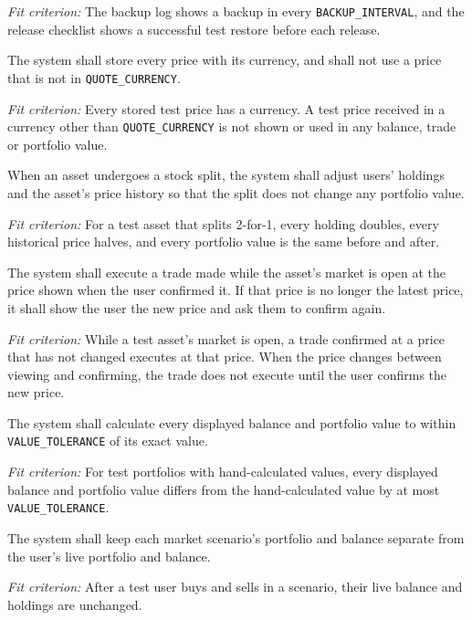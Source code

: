 \documentclass[12pt]{article}
\begin{document}
\begin{description}
\textit{Fit criterion:} The backup log shows a backup in every
\texttt{BACKUP\_INTERVAL}, and the release checklist shows a successful test
restore before each release.

\item[SEC-27 (Prices in one currency).] The system shall store every price with its currency, and shall not use a
price that is not in \texttt{QUOTE\_CURRENCY}.

\textit{Fit criterion:} Every stored test price has a currency. A test price
received in a currency other than \texttt{QUOTE\_CURRENCY} is not shown or
used in any balance, trade or portfolio value.

\item[SEC-28 (Apply stock splits).] When an asset undergoes a stock split, the system shall adjust users' holdings
and the asset's price history so that the split does not change any portfolio
value.

\textit{Fit criterion:} For a test asset that splits 2-for-1, every holding
doubles, every historical price halves, and every portfolio value is the same
before and after.

\item[SEC-29 (Trade at the confirmed price).] The system shall execute a trade made while the asset's market is open at the
price shown when the user confirmed it. If that price is no longer the latest
price, it shall show the user the new price and ask them to confirm again.

\textit{Fit criterion:} While a test asset's market is open, a trade confirmed
at a price that has not changed executes at that price. When the price changes
between viewing and confirming, the trade does not execute until the user
confirms the new price.

\item[SEC-30 (Accurate values).] The system shall calculate every displayed balance and portfolio value to
within \texttt{VALUE\_TOLERANCE} of its exact value.

\textit{Fit criterion:} For test portfolios with hand-calculated values, every
displayed balance and portfolio value differs from the hand-calculated value
by at most \texttt{VALUE\_TOLERANCE}.

\item[SEC-31 (Separate scenario portfolios).] The system shall keep each market scenario's portfolio and balance separate
from the user's live portfolio and balance.

\textit{Fit criterion:} After a test user buys and sells in a scenario, their
live balance and holdings are unchanged.


\end{description}
\end{document}
